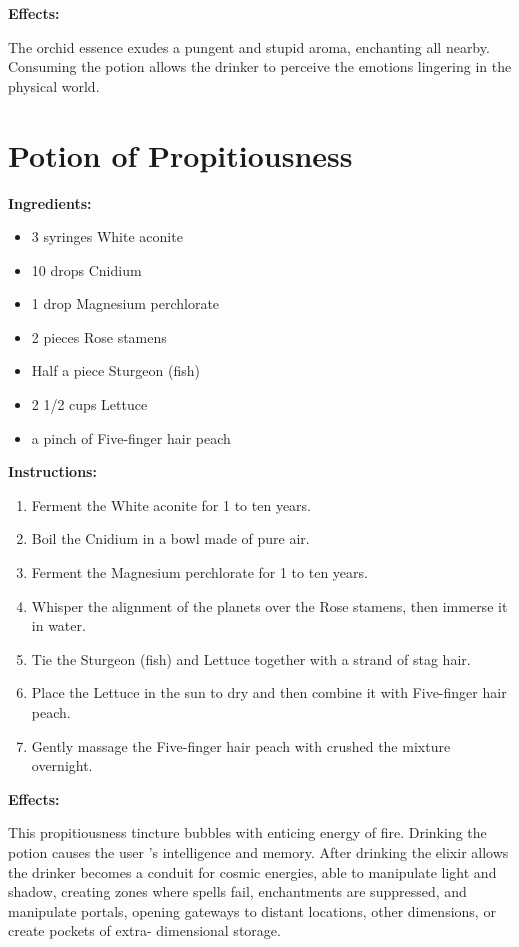 \documentclass{article}
\begin{document}
\textbf{Effects:}

The orchid essence exudes a pungent and stupid aroma, enchanting all nearby. Consuming the potion allows the drinker to perceive the emotions lingering in the physical world.

\newpage
\section*{Potion of Propitiousness}

\textbf{Ingredients:}

\begin{itemize}
  \item 3 syringes White aconite
  \item 10 drops Cnidium
  \item 1 drop Magnesium perchlorate
  \item 2 pieces Rose stamens
  \item Half a piece Sturgeon (fish)
  \item 2 1/2 cups Lettuce
  \item a pinch of Five-finger hair peach
\end{itemize}

\textbf{Instructions:}

\begin{enumerate}
  \item Ferment the White aconite for 1 to ten years.
  \item Boil the Cnidium in a bowl made of pure air.
  \item Ferment the Magnesium perchlorate for 1 to ten years.
  \item Whisper the alignment of the planets over the Rose stamens, then immerse it in water.
  \item Tie the Sturgeon (fish) and Lettuce together with a strand of stag hair.
  \item Place the Lettuce in the sun to dry and then combine it with Five-finger hair peach.
  \item Gently massage the Five-finger hair peach with crushed the mixture overnight.
\end{enumerate}

\textbf{Effects:}

This propitiousness tincture bubbles with enticing energy of fire. Drinking the potion causes the user 's intelligence and memory. After drinking the elixir allows the drinker becomes a conduit for cosmic energies, able to manipulate light and shadow, creating zones where spells fail, enchantments are suppressed, and manipulate portals, opening gateways to distant locations, other dimensions, or create pockets of extra- dimensional storage.
\end{document}
